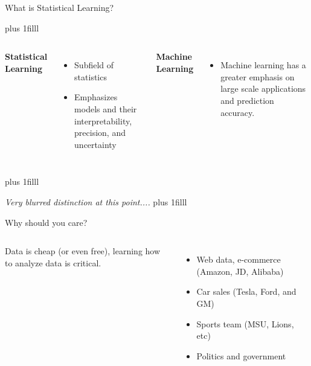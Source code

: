 \documentclass[aspectratio=169,usenames,dvipsnames]{beamer}
\newcommand{\bvfill}{\vskip0pt plus 1filll}
\begin{document}
%
%
\begin{frame}{What is Statistical Learning?}


	\bvfill
	\begin{columns}
	\centering
\textbf{Statistical Learning}
\begin{itemize}
	\item Subfield of statistics
	\item Emphasizes models and their interpretability, precision, and uncertainty
\end{itemize}

	\centering
	\textbf{Machine Learning }

	\begin{itemize}
\item
Machine learning has a greater emphasis on large scale applications and prediction accuracy.
	\end{itemize}
	\end{columns}

	\bvfill \centering

	\textit{Very blurred distinction at this point....}
	\bvfill

\end{frame}
\begin{frame}[c]{Why should you care?}

\begin{columns}

Data is cheap (or even free), learning how to analyze data is critical.
\begin{itemize}
	\item
Web data, e-commerce (Amazon, JD, Alibaba)
	\item
Car sales (Tesla, Ford, and GM)
	\item
Sports team (MSU, Lions, etc)
\item Politics and government

\end{itemize}



\end{columns}

\end{frame}
\end{document}
